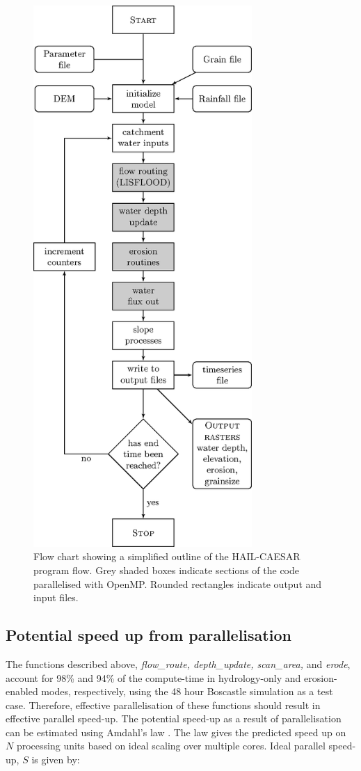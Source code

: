 \begin{figure}[t]
\includegraphics[width=8.3cm]{chp05_figures_scripts/tikz.eps}
\caption{Flow chart showing a simplified outline of the HAIL-CAESAR program flow. Grey shaded boxes indicate sections of the code parallelised with OpenMP. Rounded rectangles indicate output and input files.}
\label{fig_flowchart}
\end{figure}

\subsection{Potential speed up from parallelisation}

The functions described above, \textit{flow\_route, depth\_update, scan\_area,} and \textit{erode}, account for 98\% and 94\% of the compute-time in hydrology-only and erosion-enabled modes, respectively, using the 48 hour Boscastle simulation as a test case. Therefore, effective parallelisation of these functions should result in effective parallel speed-up. The potential speed-up as a result of parallelisation can be estimated using Amdahl's law \citep{amdahl1967validity}. The law gives the predicted speed up on \(N\) processing units based on ideal scaling over multiple cores. Ideal parallel speed-up, \(S\) is given by:

